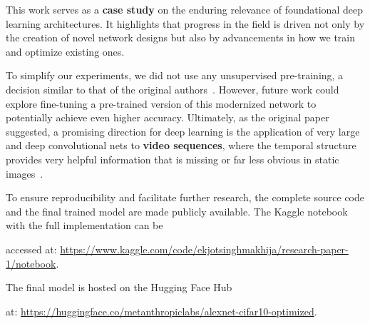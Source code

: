 \documentclass{article}
\begin{document}
This work serves as a \textbf{case study} on the enduring relevance of foundational deep learning architectures. It highlights that progress in the field is driven not only by the creation of novel network designs but also by advancements in how we train and optimize existing ones.

To simplify our experiments, we did not use any unsupervised pre-training, a decision similar to that of the original authors~\cite{krizhevsky2012imagenet}. However, future work could explore fine-tuning a pre-trained version of this modernized network to potentially achieve even higher accuracy. Ultimately, as the original paper suggested, a promising direction for deep learning is the application of very large and deep convolutional nets to \textbf{video sequences}, where the temporal structure provides very helpful information that is missing or far less obvious in static images~\cite{krizhevsky2012imagenet}.

To ensure reproducibility and facilitate further research, the complete source code and the final trained model are made publicly available. The Kaggle notebook with the full implementation can be 

accessed at: \url{https://www.kaggle.com/code/ekjotsinghmakhija/research-paper-1/notebook}. 

The final model is hosted on the Hugging Face Hub 

at: \url{https://huggingface.co/metanthropiclabs/alexnet-cifar10-optimized}.


\newpage
\end{document}
